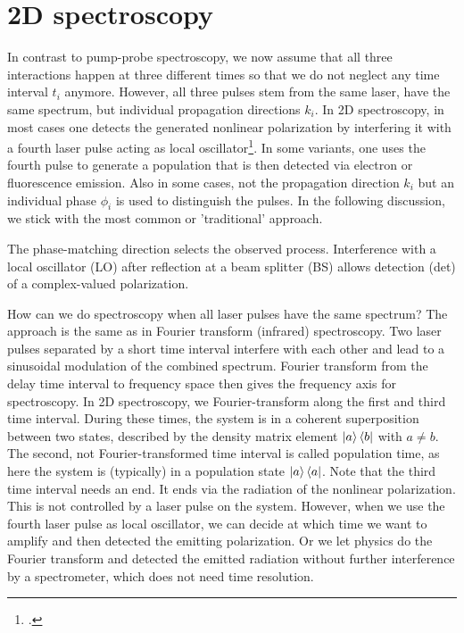 \section{2D spectroscopy}


In contrast to pump-probe spectroscopy, we now assume that all three interactions happen at three different times so that we do not neglect any time interval $t_i$ anymore. However, all three pulses stem from the same laser, have the same spectrum, but individual propagation directions $k_i$. In 2D spectroscopy, in most cases one detects the generated nonlinear polarization by  interfering it with a fourth laser pulse acting as local oscillator\footcite{Ogilvie15,Scholes13}. In some variants, one uses the fourth pulse to generate a population that is then detected via electron or fluorescence emission. Also in some cases, not the propagation direction $k_i$ but an individual phase $\phi_i$ is used to distinguish the pulses. In the following discussion, we stick with the most common or 'traditional' approach.

\begin{marginfigure}

\caption{The phase-matching direction selects the observed process. Interference with a local oscillator (LO) after reflection at a beam splitter (BS) allows detection (det) of a complex-valued polarization.}
\label{fig:2d_setup_phasematch}
\end{marginfigure}


How can we do spectroscopy when all laser pulses have the same spectrum? The approach is the same as in Fourier transform (infrared) spectroscopy. Two laser pulses separated by a short time interval interfere with each other and lead to a sinusoidal modulation of the combined spectrum. Fourier transform from the delay time interval to frequency space then gives the frequency axis for spectroscopy. In 2D spectroscopy, we Fourier-transform along the first and third time interval. During these times, the system is in a coherent superposition between two states, described by the density matrix element $\ket{a}\bra{b}$ with $a \neq b$. The second, not Fourier-transformed time interval is called population time, as here the system is (typically) in a population state $\ket{a}\bra{a}$. Note that the third time interval needs an end. It ends via the radiation of the nonlinear polarization. This is not controlled by a laser pulse on the system. However, when we use the fourth laser pulse as local oscillator, we can decide at which  time we want to amplify and then detected the emitting polarization. Or we let physics do the Fourier transform and detected the emitted radiation without further interference by a spectrometer, which does not need time resolution.

